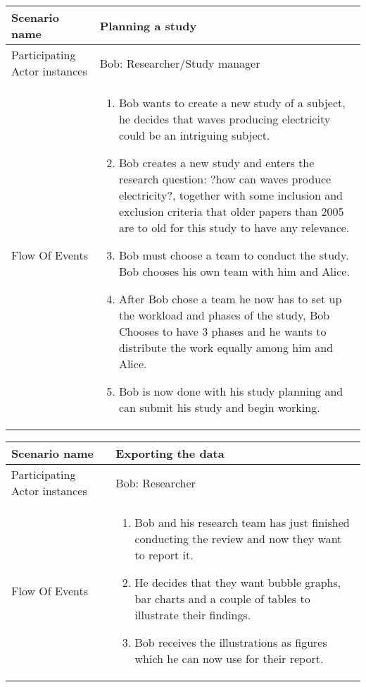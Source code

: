 \hspace{1.5cm}

\begin{center}
	\begin{tabular}{ | l | p{9cm} |} \hline
	    Scenario name & \textbf{Planning a study}\\ \hline
	    Participating Actor instances &  Bob: Researcher/Study manager\\ \hline
	    Flow Of Events &
	    \begin{enumerate}
		    \item Bob wants to create a new study of a subject, he decides that waves producing electricity could be an intriguing subject.
		    \item Bob creates a new study and enters the research question: ?how can waves produce electricity?, together with some inclusion and exclusion criteria that older papers than 2005 are to old for this study to have any relevance.
		    \item Bob must choose a team to conduct the study. Bob chooses his own team with him and Alice.
		    \item After Bob chose a team he now has to set up the workload and phases of the study, Bob Chooses to have 3 phases and he wants to distribute the work equally among him and Alice.
		    \item Bob is now done with his study planning and can submit his study and begin working.
		    		    
	    \end{enumerate}\\ \hline
	\end{tabular}
\end{center}

\hspace{1.5cm}

\begin{center}
	\begin{tabular}{ | l | p{9cm} |} \hline
	    Scenario name & \textbf{Exporting the data}\\ \hline
	    Participating Actor instances &  Bob: Researcher\\ \hline
	    Flow Of Events &
	    \begin{enumerate}
		    \item Bob and his research team has just finished conducting the review and now they want to report it.
		    \item He decides that they want bubble graphs, bar charts and a couple of tables to illustrate their findings.
		    \item Bob receives the illustrations as figures which he can now use for their report.
		    		    
	    \end{enumerate}\\ \hline
	\end{tabular}
\end{center}